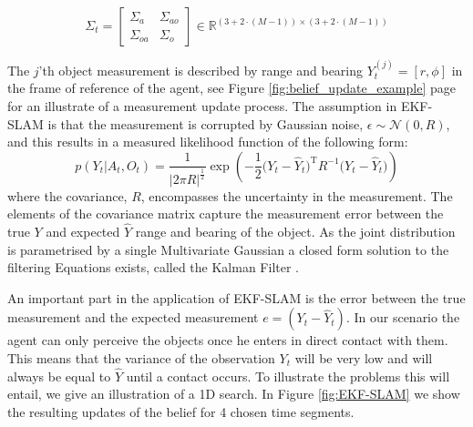 \begin{equation}
\Sigma_t = \begin{bmatrix}
       \Sigma_a & \Sigma_{ao}  \\[0.3em]
       \Sigma_{oa} & \Sigma_o
     \end{bmatrix}
     \in \mathbb{R}^{(3 + 2\cdot (M-1)) \times (3 + 2\cdot (M-1))}
\end{equation}

The $j$'th object measurement is described by range and bearing  $Y^{(j)}_t = [r,\phi]$ in the frame of reference of the agent,
see Figure \ref{fig:belief_update_example} page \pageref{fig:belief_update_example} for an illustrate of a measurement update process.
The assumption in EKF-SLAM is that the measurement is corrupted by Gaussian noise, $\epsilon \sim \mathcal{N}(0,R)$,
and this results in a measured likelihood function of the following form:
\begin{equation} \label{eq:lik-measurement}
   p(Y_t|A_t,O_t) = \frac{1}{|2\pi R|^{\frac{1}{2}}} \exp \left( -\frac{1}{2} \big(Y_t - \hat{Y}_t\big)^{\mathrm{T}}R^{-1}\big(Y_t - \hat{Y}_t\big) \right)
\end{equation}
where the covariance, $R$, encompasses the uncertainty in the measurement. The elements of the covariance matrix capture 
the measurement error between the true $Y$ and expected $\hat{Y}$ range and bearing of the object. As the joint distribution 
is parametrised by a single Multivariate Gaussian a closed form solution to the filtering Equations exists, called the Kalman Filter \cite{SLAM_part1}. 

An important part in the application of EKF-SLAM is the error between the true measurement and the expected measurement 
$e = (Y_t - \hat{Y}_t)$. In our scenario the agent can only perceive the objects once he enters in direct contact with them. 
This means that the variance of the observation $Y_t$ will be very low and will always be equal to $\hat{Y}$ until a contact occurs. 
To illustrate the problems this will entail, we give an illustration of a 1D search. In Figure \ref{fig:EKF-SLAM} we show the 
resulting updates of the belief for 4 chosen time segments.

